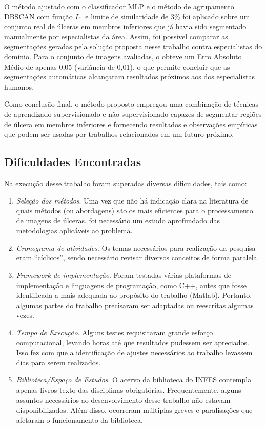 O método \system ajustado com o classificador MLP e o método de agrupamento DBSCAN com função $L_1$ e limite de similaridade de $3\%$ foi aplicado sobre um conjunto real de úlceras em membros inferiores que já havia sido segmentado manualmente por especialistas da área.
Assim, foi possível comparar as segmentações geradas pela solução proposta nesse trabalho contra especialistas do domínio.
Para o conjunto de imagens avaliadas, o \system obteve um Erro Absoluto Médio de apenas 0,05 (variância de 0,01), o que permite concluir que as segmentações automáticas alcançaram resultados próximos aos dos especialistas humanos.

Como conclusão final, o método \system proposto empregou uma combinação de técnicas de aprendizado supervisionado e não-supervisionado capazes de segmentar regiões de úlcera em membros inferiores e fornecendo resultados e observações empíricas que podem ser usadas por trabalhos relacionados em um futuro próximo.


\subsection{Dificuldades Encontradas}

Na execução desse trabalho foram superadas diversas dificuldades, tais como:

\begin{enumerate}

    \item \textit{Seleção dos métodos}.
    Uma vez que não há indicação clara na literatura de quais métodos (ou abordagens) são os mais eficientes para o processamento de imagens de úlceras, foi necessário um estudo aprofundado das metodologias aplicáveis ao problema.

    \item \textit{Cronograma de atividades}. 
    Os temas necessários para realização da pesquisa eram ``cíclicos'', sendo necessário revisar diversos conceitos de forma paralela.

    \item \textit{Framework de implementação}. 
    Foram testadas várias plataformas de implementação e linguagens de programação, como C++, antes que fosse identificada a mais adequada ao propósito do trabalho (Matlab). 
    Portanto, algumas partes do trabalho precisaram ser adaptadas ou reescritas algumas vezes.

    \item \textit{Tempo de Execução}. 
    Alguns testes requisitaram grande esforço computacional, levando horas até que resultados pudessem ser apreciados. 
    Isso fez com que a identificação de ajustes necessários ao trabalho levassem dias para serem realizados.

    \item \textit{Biblioteca/Espaço de Estudos}. 
    O acervo da biblioteca do INFES contempla apenas livros-texto das disciplinas obrigatórias.
    Frequentemente, alguns assuntos necessários ao desenvolvimento desse trabalho não estavam disponibilizados.
    Além disso, ocorreram múltiplas greves e paralisações que afetaram o funcionamento da biblioteca.
  
\end{enumerate}


